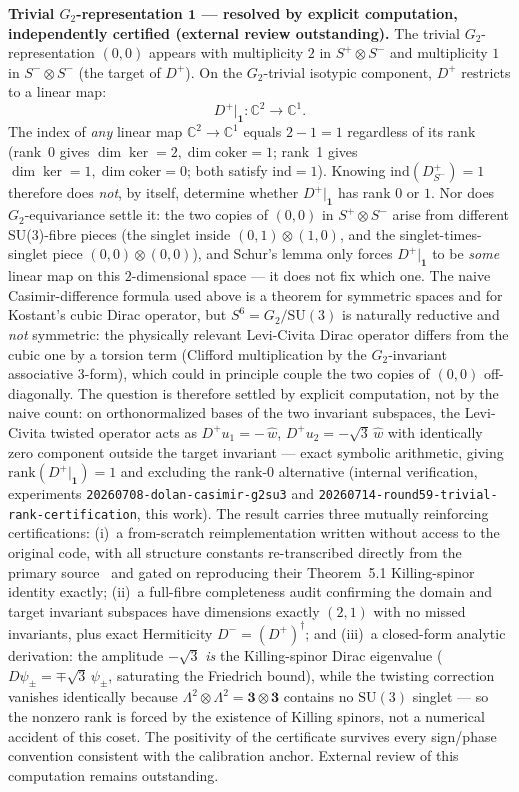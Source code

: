 \documentclass[12pt,a4paper]{article}
\newcommand{\ind}{\mathrm{ind}}
\newcommand{\CC}{\mathbb{C}}
\begin{document}
\textbf{Trivial $G_2$-representation $\mathbf{1}$ --- resolved by explicit
computation, independently certified (external review outstanding).}
The trivial $G_2$-representation $(0,0)$ appears with multiplicity $2$ in $S^+\otimes S^-$
and multiplicity $1$ in $S^-\otimes S^-$ (the target of $D^+$).
On the $G_2$-trivial isotypic component, $D^+$ restricts to a linear map:
\[
  D^+\big|_{\mathbf{1}}: \mathbb{C}^2 \to \mathbb{C}^1.
\]
The index of \emph{any} linear map $\CC^2\to\CC^1$ equals $2-1=1$ regardless of its rank
(rank~0 gives $\dim\ker=2,\dim\mathrm{coker}=1$; rank~1 gives $\dim\ker=1,\dim\mathrm{coker}=0$;
both satisfy $\ind=1$). Knowing $\ind(D^+_{S^-})=1$ therefore does \emph{not}, by itself,
determine whether $D^+|_{\mathbf{1}}$ has rank $0$ or $1$. Nor does $G_2$-equivariance
settle it: the two copies of $(0,0)$ in $S^+\otimes S^-$ arise from different SU(3)-fibre
pieces (the singlet inside $(0,1)\otimes(1,0)$, and the singlet-times-singlet piece
$(0,0)\otimes(0,0)$), and Schur's lemma only forces $D^+|_{\mathbf 1}$ to be \emph{some}
linear map on this $2$-dimensional space --- it does not fix which one. The naive
Casimir-difference formula used above is a theorem for symmetric spaces and for Kostant's
cubic Dirac operator, but $S^6=G_2/\mathrm{SU}(3)$ is naturally reductive and
\emph{not} symmetric: the physically relevant Levi-Civita Dirac operator differs from the
cubic one by a torsion term (Clifford multiplication by the $G_2$-invariant associative
$3$-form), which could in principle couple the two copies of $(0,0)$ off-diagonally.
The question is therefore settled by explicit computation, not by the naive count: on
orthonormalized bases of the two invariant subspaces, the Levi-Civita twisted operator
acts as $D^+u_1 = -\,\hat w$, $D^+u_2 = -\sqrt{3}\,\hat w$ with identically zero
component outside the target invariant --- exact symbolic arithmetic, giving
$\mathrm{rank}(D^+|_{\mathbf 1})=1$ and excluding the rank-$0$ alternative
(internal verification, experiments \texttt{20260708-dolan-casimir-g2su3} and
\texttt{20260714-round59-trivial-rank-certification}, this work). The result carries
three mutually reinforcing certifications: (i)~a from-scratch reimplementation written
without access to the original code, with all structure constants re-transcribed
directly from the primary source~\cite{AgrHofLawn2023} and gated on reproducing their
Theorem~5.1 Killing-spinor identity exactly; (ii)~a full-fibre completeness audit
confirming the domain and target invariant subspaces have dimensions exactly $(2,1)$
with no missed invariants, plus exact Hermiticity $D^-=(D^+)^\dagger$; and (iii)~a
closed-form analytic derivation: the amplitude $-\sqrt{3}$ \emph{is} the Killing-spinor
Dirac eigenvalue ($D\psi_\pm=\mp\sqrt{3}\,\psi_\pm$, saturating the Friedrich bound),
while the twisting correction vanishes identically because $\Lambda^2\otimes\Lambda^2 =
\mathbf{3}\otimes\mathbf{3}$ contains no $\mathrm{SU}(3)$ singlet --- so the nonzero rank
is forced by the existence of Killing spinors, not a numerical accident of this coset.
The positivity of the certificate survives every sign/phase convention consistent with
the calibration anchor. External review of this computation remains outstanding.
\end{document}
